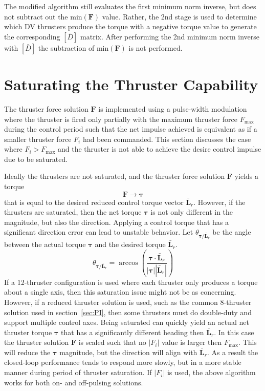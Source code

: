 \documentclass[]{BasiliskReportMemo}
\begin{document}
The modified algorithm still evaluates the first minimum norm inverse, but does not subtract out the $\text{min}(\bm F)$ value.  Rather, the 2nd stage is used to determine which DV thrusters produce the torque with a negative torque value to generate the corresponding $[\bar D]$ matrix.  After performing the 2nd minimum norm inverse with $[\bar D]$ the subtraction of  $\text{min}(\bm F)$ is not performed.  




\section{Saturating the Thruster Capability}
The thruster force solution $\bm F$ is implemented using a pulse-width modulation where the thruster is fired only partially with the maximum thruster force $F_{\text{max}}$ during the control period such that the net impulse achieved is equivalent as if a smaller thruster force $F_{i}$ had been commanded.  This section discusses the case where $F_{i}>F_{\text{max}}$ and the thruster is not able to achieve the desire control impulse due to be saturated.  

Ideally the thrusters are not saturated, and the thruster force solution $\bm F$ yields a torque
\begin{equation*}
	[D]\bm F \rightarrow \bm\tau
\end{equation*}
that is equal to the desired reduced control torque vector $\bar{\bm L}_{r}$.  However, if the thrusters are saturated, then the net torque $\bm\tau$ is not only different in the magnitude, but also the direction.  Applying a control torque that has a significant direction error can lead to unstable behavior.  Let $\theta_{\bm\tau/\bar{\bm L}_{r}}$ be the angle between the actual torque $\bm\tau$ and the desired torque $\bar{\bm L}_{r}$. 
\begin{equation}
	\theta_{\bm\tau/\bar{\bm L}_{r}} = \arccos \left( \frac{\bm\tau \cdot \bar{\bm L}_{r}}{|\bm\tau| |\bar{\bm L}_{r}|} \right)
\end{equation}
If a 12-thruster configuration is used where each thruster only produces a torque about a single axis, then this saturation issue might not be as concerning.  However, if a reduced thruster solution is used, such as the common 8-thruster solution used in section~\ref{sec:PI}, then some thrusters must do double-duty and support multiple control axes.  Being saturated can quickly yield an actual net thruster torque $\bm \tau$ that has a significantly different heading then $\bar{\bm L}_{r}$.  In this case the thruster solution $\bm F$ is scaled such that no $|F_{i}|$ value is larger  then $F_{\text{max}}$.  This will reduce the $\bm\tau$ magnitude, but the direction will align with $\bar{\bm L}_{r}$.  As a result the closed-loop performance tends to respond more slowly, but in a more stable manner during period of thruster saturation.  If $|F_{i}|$ is used, the above algorithm works for both on- and off-pulsing solutions.  
\end{document}

